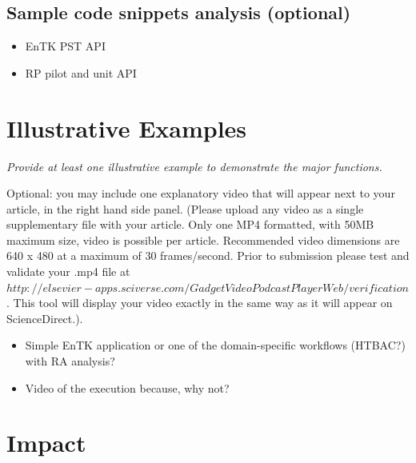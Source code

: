 \documentclass[preprint,12pt, a4paper]{elsarticle}
\begin{document}
\subsection{Sample code snippets analysis (optional)}\label{ssec:code}

\begin{itemize}
  \item EnTK PST API
  \item RP pilot and unit API
\end{itemize}

\section{Illustrative Examples}\label{sec:examples}

{\em Provide at least one illustrative example to demonstrate the major
functions.

Optional: you may include one explanatory video that will appear next to your
article, in the right hand side panel. (Please upload any video as a single
supplementary file with your article. Only one MP4 formatted, with 50MB
maximum size, video is possible per article. Recommended video dimensions are
640 x 480 at a maximum of 30 frames/second. Prior to submission please test
and validate your .mp4 file at $
http://elsevier-apps.sciverse.com/GadgetVideoPodcastPlayerWeb/verification$.
This tool will display your video exactly in the same way as it will appear
on ScienceDirect.).}

\begin{itemize}
  \item Simple EnTK application or one of the domain-specific workflows
  (HTBAC?) with RA analysis?
  \item Video of the execution because, why not?
\end{itemize}



\section{Impact}\label{sec:impact}
\end{document}
